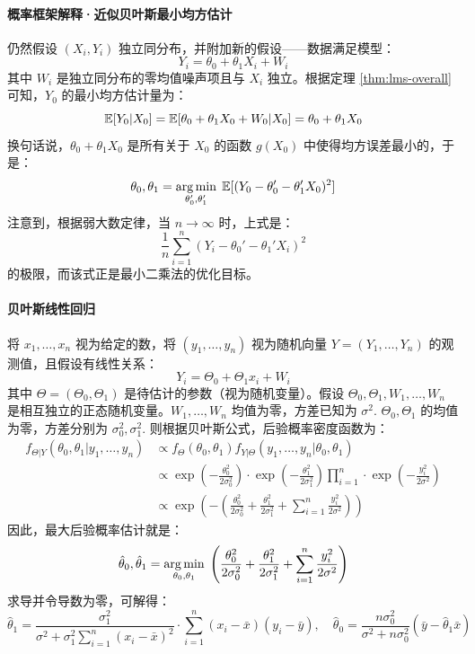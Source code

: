 \paragraph{概率框架解释·近似贝叶斯最小均方估计}

仍然假设 $(X_i,Y_i)$ 独立同分布，并附加新的假设——数据满足模型：
\[
Y_i=\theta_0+\theta_1X_i+W_i
\]
其中 $W_i$ 是独立同分布的零均值噪声项且与 $X_i$ 独立。根据定理 \ref{thm:lms-overall} 可知，$Y_0$ 的最小均方估计量为：
\[
\mathbb{E}[Y_0\vert X_0]=\mathbb{E}[\theta_0+\theta_1X_0+W_0\vert X_0]=\theta_0+\theta_1X_0
\]
换句话说，$\theta_0+\theta_1X_0$ 是所有关于 $X_0$ 的函数 $g(X_0)$ 中使得均方误差最小的，于是：
\[
\theta_0,\theta_1=\mathop{\arg\min}_{\theta_0',\theta_1'}\;\mathbb{E}[(Y_0-\theta_0'-\theta_1'X_0)^2]
\]
注意到，根据弱大数定律，当 $n\to\infty$ 时，上式是：
\[
\frac{1}{n}\sum_{i=1}^n(Y_i-\theta_0'-\theta_1'X_i)^2
\]
的极限，而该式正是最小二乘法的优化目标。

\paragraph{贝叶斯线性回归}
将 $x_1,\ldots,x_n$ 视为给定的数，将 $(y_1,\ldots,y_n)$ 视为随机向量 $Y=(Y_1,\ldots,Y_n)$ 的观测值，且假设有线性关系：
\[
Y_i=\Theta_0+\Theta_1x_i+W_i
\]
其中 $\Theta=(\Theta_0,\Theta_1)$ 是待估计的参数（视为随机变量）。假设 $\Theta_0,\Theta_1,W_1,\ldots,W_n$ 是相互独立的正态随机变量。$W_1,\ldots,W_n$ 均值为零，方差已知为 $\sigma^2$. $\Theta_0,\Theta_1$ 的均值为零，方差分别为 $\sigma_0^2,\sigma_1^2$. 则根据贝叶斯公式，后验概率密度函数为：
\begin{align*}
f_{\Theta\vert Y}(\theta_0,\theta_1\vert y_1,\ldots,y_n)&\propto f_\Theta(\theta_0,\theta_1)f_{Y\vert\Theta}(y_1,\ldots,y_n\vert \theta_0,\theta_1)\\
&\propto\exp\left(-\frac{\theta_0^2}{2\sigma_0^2}\right)\cdot\exp\left(-\frac{\theta_1^2}{2\sigma_1^2}\right)\prod_{i=1}^n\cdot\exp\left(-\frac{y_i^2}{2\sigma^2}\right)\\
&\propto\exp\left(-\left(\frac{\theta_0^2}{2\sigma_0^2}+\frac{\theta_1^2}{2\sigma_1^2}+\sum_{i=1}^n\frac{y_i^2}{2\sigma^2}\right)\right)
\end{align*}
因此，最大后验概率估计就是：
\[
\hat\theta_0,\hat\theta_1=\mathop{\arg\min}_{\theta_0,\theta_1}\;\left(\frac{\theta_0^2}{2\sigma_0^2}+\frac{\theta_1^2}{2\sigma_1^2}+\sum_{i=1}^n\frac{y_i^2}{2\sigma^2}\right)
\]
求导并令导数为零，可解得：
\[
    \hat\theta_1=\frac{\sigma_1^2}{\sigma^2+\sigma_1^2\sum_{i=1}^n(x_i-\bar x)^2}\cdot\sum_{i=1}^n(x_i-\bar x)(y_i-\bar y),\quad\hat\theta_0=\frac{n\sigma_0^2}{\sigma^2+n\sigma_0^2}(\bar y-\hat\theta_1\bar x)
\]

